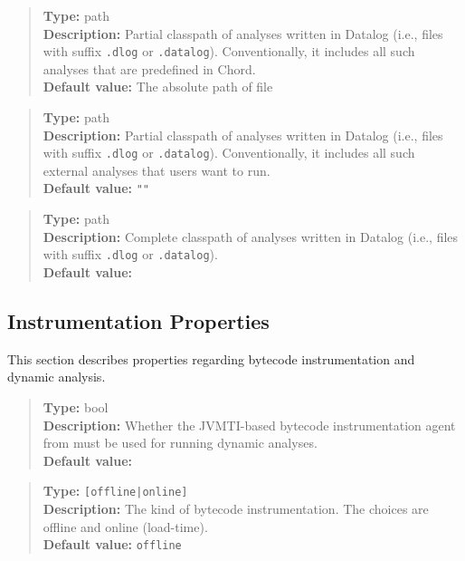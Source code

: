 \begin{quote}
{\bf Type:} path \\
{\bf Description:} Partial classpath of analyses written in Datalog (i.e., files with suffix {\tt .dlog} or {\tt .datalog}).
Conventionally, it includes all such analyses that are predefined in Chord.  \\
{\bf Default value:} The absolute path of file 
\end{quote}

\begin{quote}
{\bf Type:} path \\
{\bf Description:} Partial classpath of analyses written in Datalog (i.e., files with suffix {\tt .dlog} or {\tt .datalog}).
Conventionally, it includes all such external analyses that users want to run. \\
{\bf Default value:} {\tt ""}
\end{quote}

\begin{quote}
{\bf Type:} path  \\
{\bf Description:} Complete classpath of analyses written in Datalog (i.e., files with suffix {\tt .dlog} or {\tt .datalog}). \\
{\bf Default value:} 
\end{quote}

\subsection{Instrumentation Properties}
\label{sec:instr-props}

This section describes properties regarding bytecode instrumentation and dynamic analysis.
\\[10pt]

\begin{quote}
{\bf Type:} bool \\
{\bf Description:} Whether the JVMTI-based bytecode instrumentation agent from  must be used for running dynamic analyses. \\
{\bf Default value:} 
\end{quote}

\begin{quote}
{\bf Type:} {\tt [offline|online]}  \\
{\bf Description:} The kind of bytecode instrumentation.  The choices are offline and online (load-time).  \\
{\bf Default value:} {\tt offline}
\end{quote}

